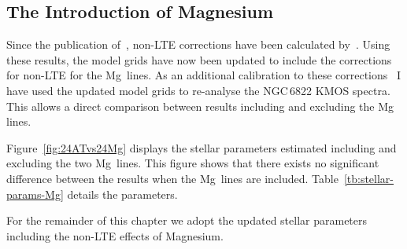 \begin{table}
\begin{center}
\begin{tabular}{lc cccc c cccc}
  \hline
  \end{tabular}
  \end{center}
\end{table}

\subsection{The Introduction of Magnesium} %
\label{sub:with_mg}

Since the publication of~\citet[][where the results from this chapter are published]{2015ApJ...803...14P}, non-LTE corrections have been calculated by~\cite{2015ApJ...804..113B}.
Using these results, the model grids have now been updated to include the corrections for non-LTE for the Mg\,\1 lines.
As an additional calibration to these corrections~\citep[to the extensive testing in][]{2015ApJ...804..113B} I have used the updated model grids to re-analyse the NGC\,6822 KMOS spectra.
This allows a direct comparison between results including and excluding the Mg\,\1 lines.



Figure~\ref{fig:24ATvs24Mg} displays the stellar parameters estimated including and excluding the two Mg\,\1 lines.
This figure shows that there exists no significant difference between the results when the Mg\,\1 lines are included.
Table~\ref{tb:stellar-params-Mg} details the parameters.

For the remainder of this chapter we adopt the updated stellar parameters including the non-LTE effects of Magnesium.


